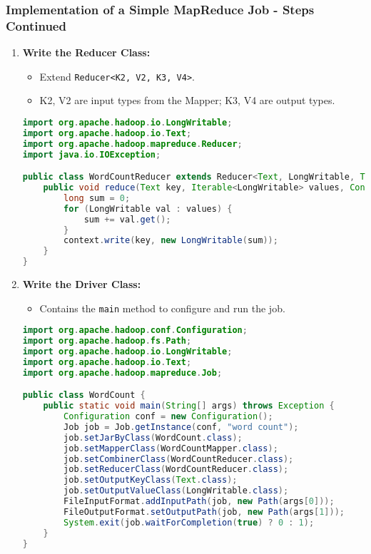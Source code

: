 \documentclass[aspectratio=169]{beamer}
\begin{document}
\begin{frame}[fragile]
    \frametitle{Implementation of a Simple MapReduce Job - Steps Continued}
    \begin{enumerate}[resume]
        \item \textbf{Write the Reducer Class:}
          \begin{itemize}
            \item Extend \texttt{Reducer<K2, V2, K3, V4>}.
            \item K2, V2 are input types from the Mapper; K3, V4 are output types.
          \end{itemize}
        \begin{lstlisting}[language=Java]
import org.apache.hadoop.io.LongWritable;
import org.apache.hadoop.io.Text;
import org.apache.hadoop.mapreduce.Reducer;
import java.io.IOException;

public class WordCountReducer extends Reducer<Text, LongWritable, Text, LongWritable> {
    public void reduce(Text key, Iterable<LongWritable> values, Context context) throws IOException, InterruptedException {
        long sum = 0;
        for (LongWritable val : values) {
            sum += val.get();
        }
        context.write(key, new LongWritable(sum));
    }
}
        \end{lstlisting}

        \item \textbf{Write the Driver Class:}
          \begin{itemize}
            \item Contains the \texttt{main} method to configure and run the job.
          \end{itemize}
        \begin{lstlisting}[language=Java]
import org.apache.hadoop.conf.Configuration;
import org.apache.hadoop.fs.Path;
import org.apache.hadoop.io.LongWritable;
import org.apache.hadoop.io.Text;
import org.apache.hadoop.mapreduce.Job;

public class WordCount {
    public static void main(String[] args) throws Exception {
        Configuration conf = new Configuration();
        Job job = Job.getInstance(conf, "word count");
        job.setJarByClass(WordCount.class);
        job.setMapperClass(WordCountMapper.class);
        job.setCombinerClass(WordCountReducer.class);
        job.setReducerClass(WordCountReducer.class);
        job.setOutputKeyClass(Text.class);
        job.setOutputValueClass(LongWritable.class);
        FileInputFormat.addInputPath(job, new Path(args[0]));
        FileOutputFormat.setOutputPath(job, new Path(args[1]));
        System.exit(job.waitForCompletion(true) ? 0 : 1);
    }
}
        \end{lstlisting}
    \end{enumerate}
\end{frame}
\end{document}
